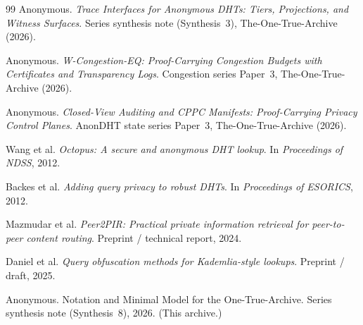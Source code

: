 \documentclass[11pt]{article}
\begin{document}
\begin{thebibliography}{99}
Anonymous.
\newblock \emph{Trace Interfaces for Anonymous DHTs: Tiers, Projections, and Witness Surfaces}.
\newblock Series synthesis note (Synthesis~3), The-One-True-Archive (2026).

Anonymous.
\newblock \emph{W-Congestion-EQ: Proof-Carrying Congestion Budgets with Certificates and Transparency Logs}.
\newblock Congestion series Paper~3, The-One-True-Archive (2026).

Anonymous.
\newblock \emph{Closed-View Auditing and CPPC Manifests: Proof-Carrying Privacy Control Planes}.
\newblock AnonDHT state series Paper~3, The-One-True-Archive (2026).

Wang et al.
\newblock \emph{Octopus: A secure and anonymous DHT lookup}.
\newblock In \emph{Proceedings of NDSS}, 2012.

Backes et al.
\newblock \emph{Adding query privacy to robust DHTs}.
\newblock In \emph{Proceedings of ESORICS}, 2012.

Mazmudar et al.
\newblock \emph{Peer2PIR: Practical private information retrieval for peer-to-peer content routing}.
\newblock Preprint / technical report, 2024.

Daniel et al.
\newblock \emph{Query obfuscation methods for Kademlia-style lookups}.
\newblock Preprint / draft, 2025.



Anonymous.
\newblock Notation and Minimal Model for the One-True-Archive.
\newblock Series synthesis note (Synthesis~8), 2026. (This archive.)

\end{thebibliography}
\end{document}
